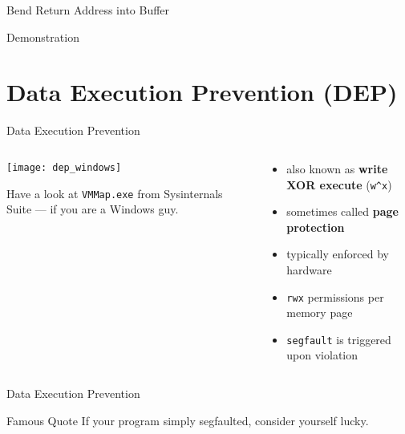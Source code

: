 \documentclass[beamer]{uibk}
\begin{document}
\begin{frame}{Bend Return Address into Buffer}
    \begin{center}
        \huge Demonstration
    \end{center}
\end{frame}

\section{Data Execution Prevention (DEP)}

\begin{frame}{Data Execution Prevention}
    \begin{columns}
        \begin{column}{0.5\textwidth}
            \begin{center}
                \texttt{[image: dep\_windows]}
            \end{center}
            \medskip

            Have a look at \texttt{VMMap.exe} from Sysinternals Suite --- if
            you are a Windows guy.
        \end{column}
        \begin{column}{0.5\textwidth}
            \begin{itemize}
                \item also known as \textbf{write XOR execute} (\texttt{w\^{}x})
                \medskip
                \item sometimes called \textbf{page protection}
                \bigskip
                \item typically enforced by hardware
                \medskip
                \item \texttt{rwx} permissions per memory page
                \medskip
                \item \texttt{segfault} is triggered upon violation
            \end{itemize}
        \end{column}
    \end{columns}
\end{frame}

\begin{frame}{Data Execution Prevention}
    \begin{block}{Famous Quote}
        If your program simply segfaulted, consider yourself lucky.
    \end{block}
\end{frame}
\end{document}
